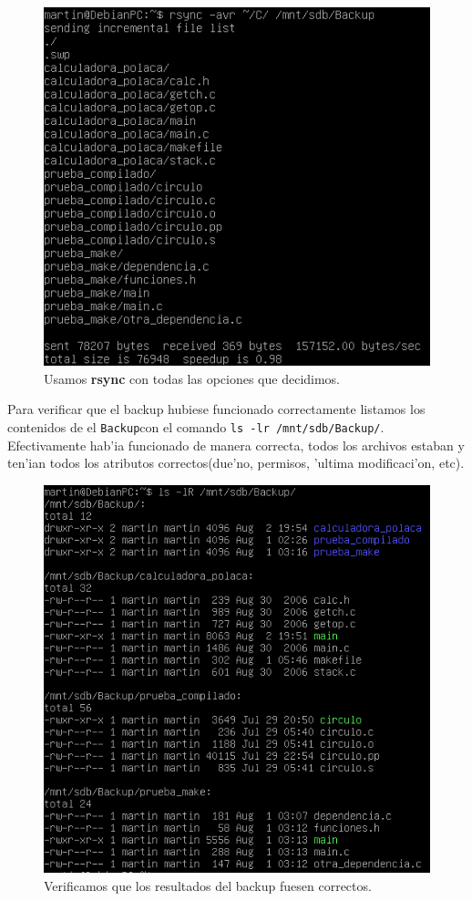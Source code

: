\documentclass[11pt]{article}
\newcommand{\rsync}[0]{\textbf{rsync}}
\newcommand{\backup}[0]{\texttt{Backup}}
\begin{document}
		\begin{figure}[H]
			\centering
			\includegraphics[scale=0.7]{Images/rsync/rsync_backup_final.PNG}
			\caption{Usamos \rsync{} con todas las opciones que decidimos.}
			\label{fig:rsync_backup_final}
		\end{figure}

		Para verificar que el backup hubiese funcionado correctamente listamos los contenidos de el \backup con el comando \texttt{ls -lr /mnt/sdb/Backup/}. Efectivamente hab'ia funcionado de manera correcta, todos los archivos estaban y ten'ian todos los atributos correctos(due'no, permisos, 'ultima modificaci'on, etc).

		\begin{figure}[H]
			\centering
			\includegraphics[scale=0.7]{Images/rsync/rsync_backup_final_result.PNG}
			\caption{Verificamos que los resultados del backup fuesen correctos.}
			\label{fig:rsync_backup_final_result}
		\end{figure}
\end{document}
